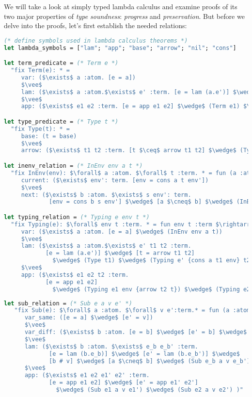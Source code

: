 \documentclass[english, mgr]{iithesis}
\renewcommand{\it}[1]{\textit{#1}}
\begin{document}
We will take a look at simply typed lambda calculus and examine proofs of
its two major properties of \it{type soundness}: \it{progress} and \it{preservation}.
But before we delve into the proofs, let's first establish the needed relations:
\begin{lstlisting}[mathescape,language=OCaml, escapebegin=\color{codepurple}]
(* define symbols used in lambda calculus theorems *)
let lambda_symbols = ["lam"; "app"; "base"; "arrow"; "nil"; "cons"]

let term_predicate = (* Term e *)
  "fix Term(e): * =
     var: ($\exists$ a :atom. [e = a])
     $\vee$
     lam: ($\exists$ a :atom.$\exists$ e' :term. [e = lam (a.e')] $\wedge$ (Term e'))
     $\vee$
     app: ($\exists$ e1 e2 :term. [e = app e1 e2] $\wedge$ (Term e1) $\wedge$ (Term e2))"

let type_predicate = (* Type t *)
  "fix Type(t): * =
     base: (t = base)
     $\vee$
     arrow: ($\exists$ t1 t2 :term. [t $\ceq$ arrow t1 t2] $\wedge$ (Type t1) $\wedge$ (Type t2))"

let inenv_relation = (* InEnv env a t *)
  "fix InEnv(env): $\forall$ a :atom. $\forall$ t :term. * = fun (a :atom) (t :term) $\rightarrow$
     current: ($\exists$ env': term. [env = cons a t env'])
     $\vee$
     next: ($\exists$ b :atom. $\exists$ s env': term.
             [env = cons b s env'] $\wedge$ [a $\cneq$ b] $\wedge$ (InEnv env' a t))"

let typing_relation = (* Typing e env t *)
  "fix Typing(e): $\forall$ env t :term. * = fun env t :term $\rightarrow$
     var: ($\exists$ a :atom. [e = a] $\wedge$ (InEnv env a t))
     $\vee$
     lam: ($\exists$ a :atom.$\exists$ e' t1 t2 :term.
            [e = lam (a.e')] $\wedge$ [t = arrow t1 t2]
              $\wedge$ (Type t1) $\wedge$ (Typing e' {cons a t1 env} t2))
     $\vee$
     app: ($\exists$ e1 e2 t2 :term.
            [e = app e1 e2]
              $\wedge$ (Typing e1 env {arrow t2 t}) $\wedge$ (Typing e2 env t2))"
\end{lstlisting}
\begin{lstlisting}[mathescape,language=OCaml, escapebegin=\color{codepurple}]
 let sub_relation = (* Sub e a v e' *)
   "fix Sub(e): $\forall$ a :atom. $\forall$ v e':term.* = fun (a :atom) (v e' :term) $\rightarrow$
      var_same: ([e = a] $\wedge$ [e' = v])
      $\vee$
      var_diff: ($\exists$ b :atom. [e = b] $\wedge$ [e' = b] $\wedge$ [a $\cneq$ b])
      $\vee$
      lam: ($\exists$ b :atom. $\exists$ e_b e_b' :term.
             [e = lam (b.e_b)] $\wedge$ [e' = lam (b.e_b')] $\wedge$
             [b # v] $\wedge$ [a $\cneq$ b] $\wedge$ (Sub e_b a v e_b') )
      $\vee$
      app: ($\exists$ e1 e2 e1' e2' :term.
             [e = app e1 e2] $\wedge$ [e' = app e1' e2']
               $\wedge$ (Sub e1 a v e1') $\wedge$ (Sub e2 a v e2') )"
\end{lstlisting}
\end{document}
